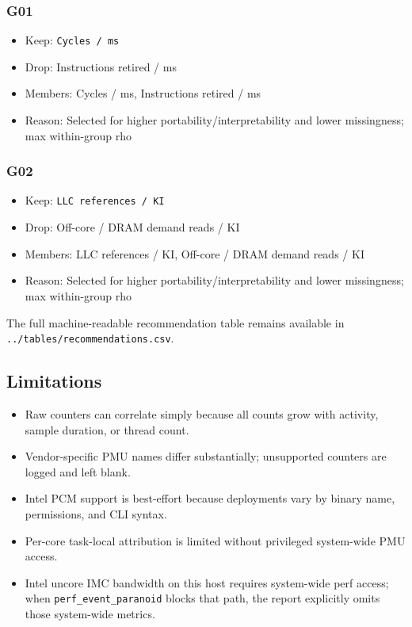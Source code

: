 \documentclass[
]{article}
\providecommand{\tightlist}{%
  \setlength{\itemsep}{0pt}\setlength{\parskip}{0pt}}
\begin{document}
\hypertarget{g01}{%
\subsubsection{G01}\label{g01}}

\begin{itemize}
\tightlist
\item
  Keep: \texttt{Cycles\ /\ ms}
\item
  Drop: Instructions retired / ms
\item
  Members: Cycles / ms, Instructions retired / ms
\item
  Reason: Selected for higher portability/interpretability and lower
  missingness; max within-group \textbar rho
\end{itemize}

\hypertarget{g02}{%
\subsubsection{G02}\label{g02}}

\begin{itemize}
\tightlist
\item
  Keep: \texttt{LLC\ references\ /\ KI}
\item
  Drop: Off-core / DRAM demand reads / KI
\item
  Members: LLC references / KI, Off-core / DRAM demand reads / KI
\item
  Reason: Selected for higher portability/interpretability and lower
  missingness; max within-group \textbar rho
\end{itemize}

The full machine-readable recommendation table remains available in
\texttt{../tables/recommendations.csv}.

\hypertarget{limitations}{%
\subsection{Limitations}\label{limitations}}

\begin{itemize}
\tightlist
\item
  Raw counters can correlate simply because all counts grow with
  activity, sample duration, or thread count.
\item
  Vendor-specific PMU names differ substantially; unsupported counters
  are logged and left blank.
\item
  Intel PCM support is best-effort because deployments vary by binary
  name, permissions, and CLI syntax.
\item
  Per-core task-local attribution is limited without privileged
  system-wide PMU access.
\item
  Intel uncore IMC bandwidth on this host requires system-wide perf
  access; when \texttt{perf\_event\_paranoid} blocks that path, the
  report explicitly omits those system-wide metrics.
\end{itemize}
\end{document}

